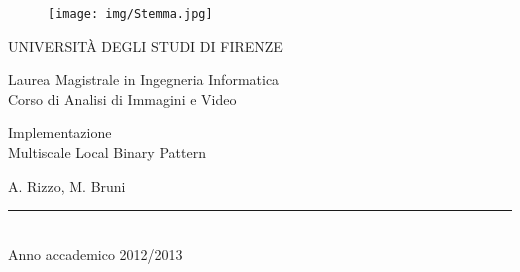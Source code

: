 \documentclass[a4paper,10pt]{article}
\begin{document}

\begin{titlepage}
\thispagestyle{empty}
\topmargin=1cm
\large

\begin{figure}[ht]
\centering
\texttt{[image: img/Stemma.jpg]}
\end{figure}

\begin{center}

UNIVERSITÀ DEGLI STUDI DI FIRENZE
\vspace{0.5cm}

Laurea Magistrale in Ingegneria Informatica
\\
\normalsize
Corso di Analisi di Immagini e Video
\vspace{4cm}

\begin{huge}
Implementazione \\
Multiscale Local Binary Pattern
\end{huge}

\vspace{0.5cm}

A. Rizzo, M. Bruni

\vspace{5cm}
\rule{5cm}{.4pt}
\\
Anno accademico 2012/2013
\end{center}
\end{titlepage}



\tableofcontents %

\clearpage






\pagebreak


\appendix
\listoffigures    %
\listoftables



\end{document}
